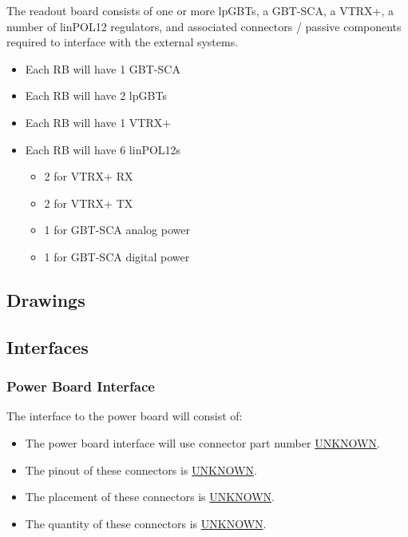 \documentclass[11pt]{article}
\begin{document}
The readout board consists of one or more lpGBTs, a GBT-SCA, a VTRX+, a number of linPOL12 regulators, and associated connectors / passive components required to interface with the external systems.

\begin{itemize}
\item Each RB will have 1 GBT-SCA
\item Each RB will have 2 lpGBTs
\item Each RB will have 1 VTRX+
\item Each RB will have 6 linPOL12s
\begin{itemize}
\item 2 for VTRX+ RX
\item 2 for VTRX+ TX
\item 1 for GBT-SCA analog power
\item 1 for GBT-SCA digital power
\end{itemize}
\end{itemize}
\subsection{Drawings}
\label{sec:org42ac7ca}
\subsection{Interfaces}
\label{sec:org0f96899}
\subsubsection{Power Board Interface}
\label{sec:orge05ed4e}
The interface to the power board will consist of:
\begin{itemize}
\item The power board interface will use connector part number \uline{UNKNOWN}.
\item The pinout of these connectors is \uline{UNKNOWN}.
\item The placement of these connectors is \uline{UNKNOWN}.
\item The quantity of these connectors is \uline{UNKNOWN}.
\end{itemize}
\end{document}
